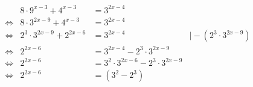 \begin{uebung}[3]
	\begin{equation*}
		\begin{array}{lrlr}
			                & 8 \cdot 9^{x-3} + 4^{x-3}     & = 3^{2x-4}                                    &                            \\
			\Leftrightarrow & 8 \cdot 3^{2x-9} + 4^{x-3}    & = 3^{2x-4}                                    &                            \\
			\Leftrightarrow & 2^3 \cdot 3^{2x-9} + 2^{2x-6} & = 3^{2x-4}                                    & \mid -(2^3 \cdot 3^{2x-9}) \\
			\Leftrightarrow & 2^{2x-6}                      & = 3^{2x-4} - 2^3 \cdot 3^{2x-9}               &                            \\
			\Leftrightarrow & 2^{2x-6}                      & = 3^{2} \cdot 3^{2x-6} - 2^{3} \cdot 3^{2x-9}                              \\
			\Leftrightarrow & 2^{2x-6}                      & = (3^2 - 2^3)
		\end{array}
	\end{equation*}
\end{uebung}

